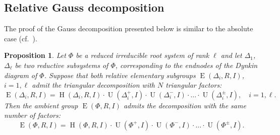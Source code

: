 \documentclass[oneside, 12pt]{amsart}
\theoremstyle{plain}
\numberwithin{equation}{section}
\numberwithin{lemma}{section}
\newtheorem{prop}[lemma]{Proposition}
\theoremstyle{definition}
\theoremstyle{remark}
\DeclareMathOperator{\E}{E}
\DeclareMathOperator{\Hh}{H}
\DeclareMathOperator{\U}{U}
\begin{document}
\subsection{Relative Gauss decomposition}\label{sec:gauss}
The proof of the Gauss decomposition presented below is similar to the absolute case (cf.~\cite[Theorem~5.1]{Sm12}).
\begin{prop}\label{thm:Gauss}
Let $\Phi$ be a reduced irreducible root system of rank $\ell$ and let $\Delta_1$, $\Delta_\ell$ be
two reductive subsystems of $\Phi$, corresponding to the endnodes of the Dynkin diagram of $\Phi$.
Suppose that both relative elementary subgroups $\E(\Delta_i, R, I)$, $i=1, \ell$ admit the triangular decomposition with $N$ triangular factors:
\[ \E(\Delta_i, R, I) = \Hh(\Delta_i, R, I) \cdot \U(\Delta^+_i, I) \cdot \U(\Delta^-_i, I) \cdot \ldots \cdot \U(\Delta^\pm_i, I), \quad i=1, \ell. \]
Then the ambient group $\E(\Phi, R, I)$ admits the decomposition with the same number of factors:
\[ \E(\Phi, R, I) = \Hh(\Phi, R, I) \cdot \U(\Phi^+, I) \cdot \U(\Phi^-, I) \cdot \ldots \cdot \U(\Phi^\pm, I). \]
\end{prop}
\end{document}
